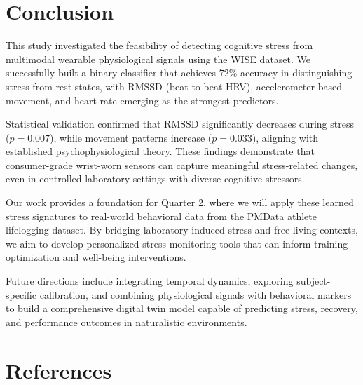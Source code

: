 \documentclass[12pt,letterpaper]{article}
\begin{document}

\section{Conclusion}

This study investigated the feasibility of detecting cognitive stress from multimodal wearable physiological signals using the WISE dataset. We successfully built a binary classifier that achieves 72\% accuracy in distinguishing stress from rest states, with RMSSD (beat-to-beat HRV), accelerometer-based movement, and heart rate emerging as the strongest predictors.

Statistical validation confirmed that RMSSD significantly decreases during stress ($p = 0.007$), while movement patterns increase ($p = 0.033$), aligning with established psychophysiological theory. These findings demonstrate that consumer-grade wrist-worn sensors can capture meaningful stress-related changes, even in controlled laboratory settings with diverse cognitive stressors.

Our work provides a foundation for Quarter 2, where we will apply these learned stress signatures to real-world behavioral data from the PMData athlete lifelogging dataset. By bridging laboratory-induced stress and free-living contexts, we aim to develop personalized stress monitoring tools that can inform training optimization and well-being interventions.

Future directions include integrating temporal dynamics, exploring subject-specific calibration, and combining physiological signals with behavioral markers to build a comprehensive digital twin model capable of predicting stress, recovery, and performance outcomes in naturalistic environments.




\section*{References}
\end{document}
